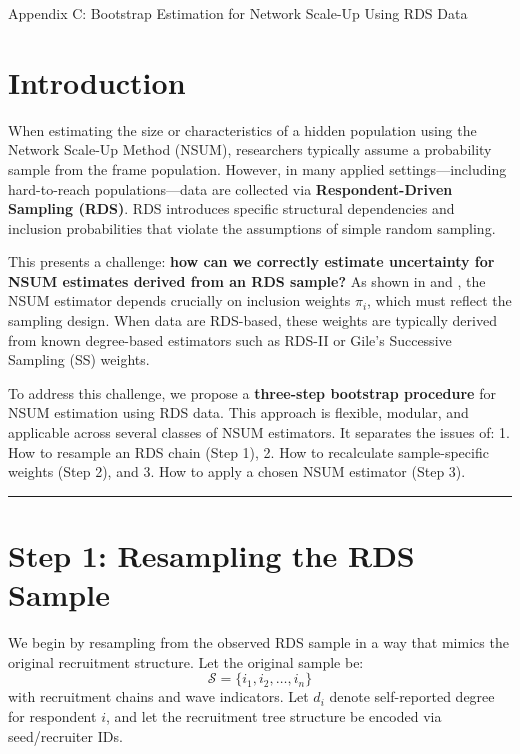 \documentclass[
  12pt,
  letterpaper,
  DIV=11,
  numbers=noendperiod]{scrartcl}
\theoremstyle{plain}
\theoremstyle{definition}
\begin{document}
Appendix C: Bootstrap Estimation for Network Scale-Up Using RDS Data

\section{Introduction}\label{introduction-1}

When estimating the size or characteristics of a hidden population using
the Network Scale-Up Method (NSUM), researchers typically assume a
probability sample from the frame population. However, in many applied
settings---including hard-to-reach populations---data are collected via
\textbf{Respondent-Driven Sampling (RDS)}. RDS introduces specific
structural dependencies and inclusion probabilities that violate the
assumptions of simple random sampling.

This presents a challenge: \textbf{how can we correctly estimate
uncertainty for NSUM estimates derived from an RDS sample?} As shown in
\textcite{feeh16-generali} and \textcite{salg06-variance}, the NSUM
estimator depends crucially on inclusion weights \(\pi_i\), which must
reflect the sampling design. When data are RDS-based, these weights are
typically derived from known degree-based estimators such as RDS-II or
Gile's Successive Sampling (SS) weights.

To address this challenge, we propose a \textbf{three-step bootstrap
procedure} for NSUM estimation using RDS data. This approach is
flexible, modular, and applicable across several classes of NSUM
estimators. It separates the issues of: 1. How to resample an RDS chain
(Step 1), 2. How to recalculate sample-specific weights (Step 2), and 3.
How to apply a chosen NSUM estimator (Step 3).

\begin{center}\rule{0.5\linewidth}{0.5pt}\end{center}

\section{Step 1: Resampling the RDS
Sample}\label{step-1-resampling-the-rds-sample}

We begin by resampling from the observed RDS sample in a way that mimics
the original recruitment structure. Let the original sample be: \[
\mathcal{S} = \{i_1, i_2, \dots, i_n\}
\] with recruitment chains and wave indicators. Let \(d_i\) denote
self-reported degree for respondent \(i\), and let the recruitment tree
structure be encoded via seed/recruiter IDs.
\end{document}
